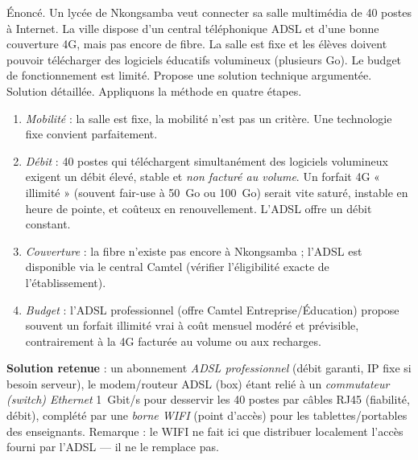 \documentclass[11pt]{article}
\begin{document}
\begin{exoresolu}
Énoncé. Un lycée de Nkongsamba veut connecter sa salle multimédia de 40 postes à Internet. La ville dispose d'un central téléphonique ADSL et d'une bonne couverture 4G, mais pas encore de fibre. La salle est fixe et les élèves doivent pouvoir télécharger des logiciels éducatifs volumineux (plusieurs Go). Le budget de fonctionnement est limité. Propose une solution technique argumentée.
\tcblower
Solution détaillée. Appliquons la méthode en quatre étapes.
\begin{enumerate}
\item \emph{Mobilité} : la salle est fixe, la mobilité n'est pas un critère. Une technologie fixe convient parfaitement.
\item \emph{Débit} : 40 postes qui téléchargent simultanément des logiciels volumineux exigent un débit élevé, stable et \emph{non facturé au volume}. Un forfait 4G « illimité » (souvent fair-use à \SI{50}{Go} ou \SI{100}{Go}) serait vite saturé, instable en heure de pointe, et coûteux en renouvellement. L'ADSL offre un débit constant.
\item \emph{Couverture} : la fibre n'existe pas encore à Nkongsamba ; l'ADSL est disponible via le central Camtel (vérifier l'éligibilité exacte de l'établissement).
\item \emph{Budget} : l'ADSL professionnel (offre Camtel Entreprise/Éducation) propose souvent un forfait illimité vrai à coût mensuel modéré et prévisible, contrairement à la 4G facturée au volume ou aux recharges.
\end{enumerate}
\textbf{Solution retenue} : un abonnement \emph{ADSL professionnel} (débit garanti, IP fixe si besoin serveur), le modem/routeur ADSL (box) étant relié à un \emph{commutateur (switch) Ethernet} \SI{1}{Gbit/s} pour desservir les 40 postes par câbles RJ45 (fiabilité, débit), complété par une \emph{borne WIFI} (point d'accès) pour les tablettes/portables des enseignants. Remarque : le WIFI ne fait ici que distribuer localement l'accès fourni par l'ADSL — il ne le remplace pas.
\end{exoresolu}
\end{document}
